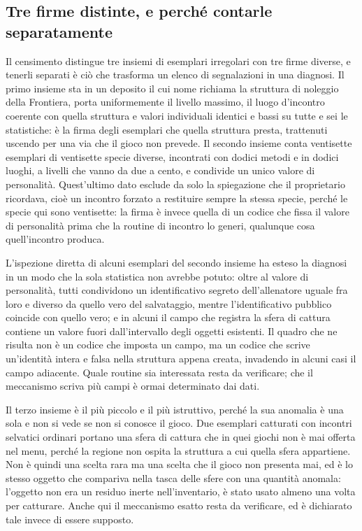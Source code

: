 \subsection{Tre firme distinte, e perché contarle separatamente}

Il censimento distingue tre insiemi di esemplari irregolari con tre firme diverse, e tenerli separati è ciò che trasforma un elenco di segnalazioni in una diagnosi. Il primo insieme sta in un deposito il cui nome richiama la struttura di noleggio della Frontiera, porta uniformemente il livello massimo, il luogo d'incontro coerente con quella struttura e valori individuali identici e bassi su tutte e sei le statistiche: è la firma degli esemplari che quella struttura presta, trattenuti uscendo per una via che il gioco non prevede. Il secondo insieme conta ventisette esemplari di ventisette specie diverse, incontrati con dodici metodi e in dodici luoghi, a livelli che vanno da due a cento, e condivide un unico valore di personalità. Quest'ultimo dato esclude da solo la spiegazione che il proprietario ricordava, cioè un incontro forzato a restituire sempre la stessa specie, perché le specie qui sono ventisette: la firma è invece quella di un codice che fissa il valore di personalità prima che la routine di incontro lo generi, qualunque cosa quell'incontro produca.

L'ispezione diretta di alcuni esemplari del secondo insieme ha esteso la diagnosi in un modo che la sola statistica non avrebbe potuto: oltre al valore di personalità, tutti condividono un identificativo segreto dell'allenatore uguale fra loro e diverso da quello vero del salvataggio, mentre l'identificativo pubblico coincide con quello vero; e in alcuni il campo che registra la sfera di cattura contiene un valore fuori dall'intervallo degli oggetti esistenti. Il quadro che ne risulta non è un codice che imposta un campo, ma un codice che scrive un'identità intera e falsa nella struttura appena creata, invadendo in alcuni casi il campo adiacente. Quale routine sia interessata resta da verificare; che il meccanismo scriva più campi è ormai determinato dai dati.

Il terzo insieme è il più piccolo e il più istruttivo, perché la sua anomalia è una sola e non si vede se non si conosce il gioco. Due esemplari catturati con incontri selvatici ordinari portano una sfera di cattura che in quei giochi non è mai offerta nel menu, perché la regione non ospita la struttura a cui quella sfera appartiene. Non è quindi una scelta rara ma una scelta che il gioco non presenta mai, ed è lo stesso oggetto che compariva nella tasca delle sfere con una quantità anomala: l'oggetto non era un residuo inerte nell'inventario, è stato usato almeno una volta per catturare. Anche qui il meccanismo esatto resta da verificare, ed è dichiarato tale invece di essere supposto.

